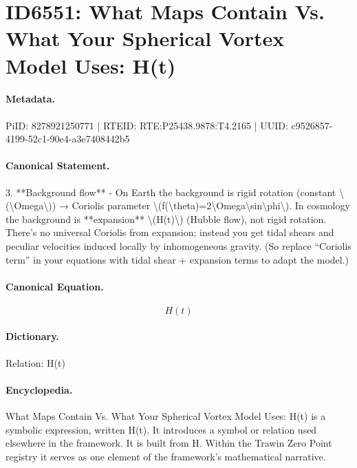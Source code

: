 \section*{ID6551: What Maps Contain Vs. What Your Spherical Vortex Model Uses: H(t)}
\paragraph{Metadata.}
PiID: 8278921250771 | RTEID: RTE:P25438.9878:T4.2165 | UUID: c9526857-4199-52c1-90e4-a3e7408442b5

\paragraph{Canonical Statement.}
3. **Background flow** - On Earth the background is rigid rotation (constant \textbackslash{}(\textbackslash{}Omega\textbackslash{})) → Coriolis parameter \textbackslash{}(f(\textbackslash{}theta)=2\textbackslash{}Omega\textbackslash{}sin\textbackslash{}phi\textbackslash{}). In cosmology the background is **expansion** \textbackslash{}(H(t)\textbackslash{}) (Hubble flow), not rigid rotation. There’s no universal Coriolis from expansion; instead you get tidal shears and peculiar velocities induced locally by inhomogeneous gravity. (So replace “Coriolis term” in your equations with tidal shear + expansion terms to adapt the model.)

\paragraph{Canonical Equation.}
\[
H(t)
\]

\paragraph{Dictionary.}
Relation: H(t)

\paragraph{Encyclopedia.}
What Maps Contain Vs. What Your Spherical Vortex Model Uses: H(t) is a symbolic expression, written H(t). It introduces a symbol or relation used elsewhere in the framework. It is built from H. Within the Trawin Zero Point registry it serves as one element of the framework's mathematical narrative.
